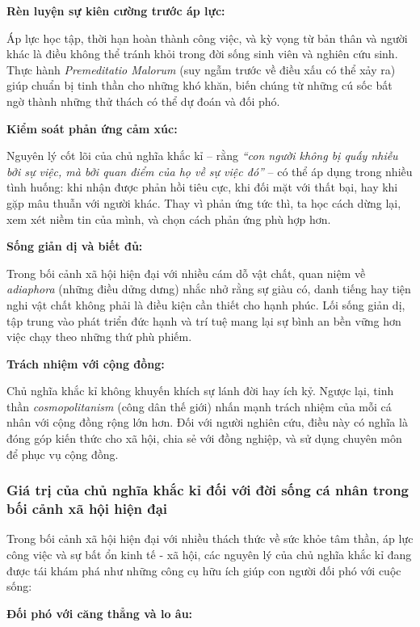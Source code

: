 \textbf{Rèn luyện sự kiên cường trước áp lực:}

Áp lực học tập, thời hạn hoàn thành công việc, và kỳ vọng từ bản thân và người khác là điều không thể tránh khỏi trong đời sống sinh viên và nghiên cứu sinh. Thực hành \textit{Premeditatio Malorum} (suy ngẫm trước về điều xấu có thể xảy ra) giúp chuẩn bị tinh thần cho những khó khăn, biến chúng từ những cú sốc bất ngờ thành những thử thách có thể dự đoán và đối phó.

\textbf{Kiểm soát phản ứng cảm xúc:}

Nguyên lý cốt lõi của chủ nghĩa khắc kỉ -- rằng \textit{``con người không bị quấy nhiễu bởi sự việc, mà bởi quan điểm của họ về sự việc đó''} -- có thể áp dụng trong nhiều tình huống: khi nhận được phản hồi tiêu cực, khi đối mặt với thất bại, hay khi gặp mâu thuẫn với người khác. Thay vì phản ứng tức thì, ta học cách dừng lại, xem xét niềm tin của mình, và chọn cách phản ứng phù hợp hơn.

\textbf{Sống giản dị và biết đủ:}

Trong bối cảnh xã hội hiện đại với nhiều cám dỗ vật chất, quan niệm về \textit{adiaphora} (những điều dửng dưng) nhắc nhở rằng sự giàu có, danh tiếng hay tiện nghi vật chất không phải là điều kiện cần thiết cho hạnh phúc. Lối sống giản dị, tập trung vào phát triển đức hạnh và trí tuệ mang lại sự bình an bền vững hơn việc chạy theo những thứ phù phiếm.

\textbf{Trách nhiệm với cộng đồng:}

Chủ nghĩa khắc kỉ không khuyến khích sự lánh đời hay ích kỷ. Ngược lại, tinh thần \textit{cosmopolitanism} (công dân thế giới) nhấn mạnh trách nhiệm của mỗi cá nhân với cộng đồng rộng lớn hơn. Đối với người nghiên cứu, điều này có nghĩa là đóng góp kiến thức cho xã hội, chia sẻ với đồng nghiệp, và sử dụng chuyên môn để phục vụ cộng đồng.

\subsubsection{Giá trị của chủ nghĩa khắc kỉ đối với đời sống cá nhân trong bối cảnh xã hội hiện đại}

Trong bối cảnh xã hội hiện đại với nhiều thách thức về sức khỏe tâm thần, áp lực công việc và sự bất ổn kinh tế - xã hội, các nguyên lý của chủ nghĩa khắc kỉ đang được tái khám phá như những công cụ hữu ích giúp con người đối phó với cuộc sống:

\textbf{Đối phó với căng thẳng và lo âu:}

